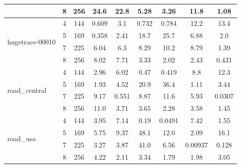 \documentclass[conference, 10ppt]{IEEEtran}
\begin{document}
\begin{table}
\begin{tabular}[c]{| l | c | c | c | c | c | c | c | c |}
 &  8  &  256 & \cellcolor{green!25}  24.6 & 22.8 & 5.28 & 3.26 & 11.8 & 1.08 \\ \hline
\multirow{4}{*}{hugetrace-00010}  &  4  &  144 & \cellcolor{blue!25}  0.609 & \cellcolor{red!25}  3.1 & 0.732 & 0.784 & 12.2 & 13.4 \\ \cline{2-9}
 &  5  &  169 & \cellcolor{blue!25}  0.358 & \cellcolor{red!25}  2.41 & 18.7 & 25.7 & 6.88 & 2.0 \\ \cline{2-9}
 &  7  &  225 & 6.04 & \cellcolor{green!25}  6.3 & 8.29 & 10.2 & 8.79 & 1.39 \\ \cline{2-9}
 &  8  &  256 & 8.02 & \cellcolor{green!25}  7.71 & 3.33 & 2.02 & 2.43 & 0.431 \\ \hline
\multirow{4}{*}{road\_central}  &  4  &  144 & 2.96 & \cellcolor{green!25}  6.02 & 0.47 & 0.419 & 8.8 & 12.3 \\ \cline{2-9}
 &  5  &  169 & 1.93 & \cellcolor{green!25}  4.52 & 20.9 & 36.4 & 1.11 & 3.44 \\ \cline{2-9}
 &  7  &  225 & 9.17 & \cellcolor{green!25}  0.551 & 8.87 & 11.6 & 5.93 & 0.0307 \\ \cline{2-9}
 &  8  &  256 & 11.0 & \cellcolor{green!25}  3.71 & 3.65 & 2.28 & 3.58 & 1.45 \\ \hline
\multirow{4}{*}{road\_usa}  &  4  &  144 & 3.95 & \cellcolor{green!25}  7.14 & 0.19 & 0.0491 & 7.42 & 1.55 \\ \cline{2-9}
 &  5  &  169 & 5.75 & \cellcolor{green!25}  9.37 & 48.1 & 12.0 & 2.09 & 16.1 \\ \cline{2-9}
 &  7  &  225 & 3.27 & \cellcolor{green!25}  3.87 & 41.0 & 6.56 & 0.00937 & 0.128 \\ \cline{2-9}
 &  8  &  256 & 4.22 & \cellcolor{green!25}  2.11 & 3.34 & 1.79 & 1.98 & 3.05 \\ \hline
  \end{tabular}
\end{table}
\end{document}
